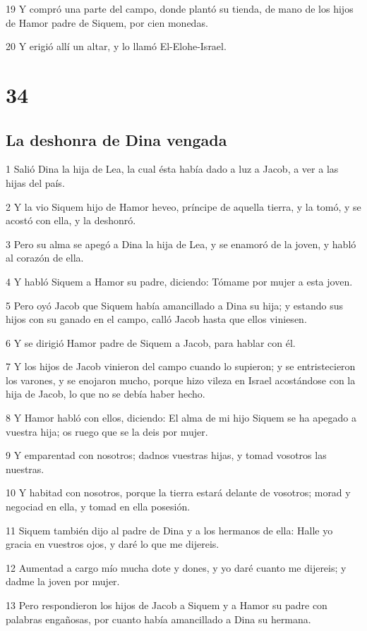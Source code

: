 19 Y compró una parte del campo, donde plantó su tienda, de mano de los hijos de Hamor padre de Siquem, por cien monedas.

20 Y erigió allí un altar, y lo llamó El-Elohe-Israel.

\chapter{34}

\section{La deshonra de Dina vengada}

1 Salió Dina la hija de Lea, la cual ésta había dado a luz a Jacob, a ver a las hijas del país.

2 Y la vio Siquem hijo de Hamor heveo, príncipe de aquella tierra, y la tomó, y se acostó con ella, y la deshonró.

3 Pero su alma se apegó a Dina la hija de Lea, y se enamoró de la joven, y habló al corazón de ella.

4 Y habló Siquem a Hamor su padre, diciendo: Tómame por mujer a esta joven.

5 Pero oyó Jacob que Siquem había amancillado a Dina su hija; y estando sus hijos con su ganado en el campo, calló Jacob hasta que ellos viniesen.

6 Y se dirigió Hamor padre de Siquem a Jacob, para hablar con él.

7 Y los hijos de Jacob vinieron del campo cuando lo supieron; y se entristecieron los varones, y se enojaron mucho, porque hizo vileza en Israel acostándose con la hija de Jacob, lo que no se debía haber hecho.

8 Y Hamor habló con ellos, diciendo: El alma de mi hijo Siquem se ha apegado a vuestra hija; os ruego que se la deis por mujer.

9 Y emparentad con nosotros; dadnos vuestras hijas, y tomad vosotros las nuestras.

10 Y habitad con nosotros, porque la tierra estará delante de vosotros; morad y negociad en ella, y tomad en ella posesión.

11 Siquem también dijo al padre de Dina y a los hermanos de ella: Halle yo gracia en vuestros ojos, y daré lo que me dijereis.

12 Aumentad a cargo mío mucha dote y dones, y yo daré cuanto me dijereis; y dadme la joven por mujer.

13 Pero respondieron los hijos de Jacob a Siquem y a Hamor su padre con palabras engañosas, por cuanto había amancillado a Dina su hermana.

